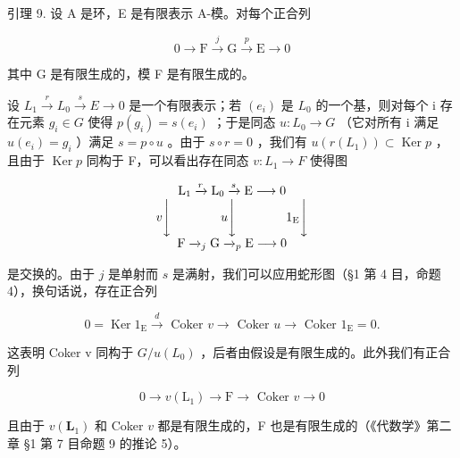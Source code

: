 引理 9. 设 A 是环，E 是有限表示 A-模。对每个正合列

\[
0 \longrightarrow \mathrm{F} \stackrel {j} {\longrightarrow} \mathrm{G} \stackrel {p} {\longrightarrow} \mathrm{E} \longrightarrow 0
\]

其中 G 是有限生成的，模 F 是有限生成的。

设 \(L_{1} \stackrel{r}{\rightarrow} L_{0} \stackrel{s}{\rightarrow} E \rightarrow 0\) 是一个有限表示；若 \((e_{i})\) 是 \(L_{0}\) 的一个基，则对每个 i 存在元素 \(g_{i} \in G\) 使得 \(p(g_{i}) = s(e_{i})\) ；于是同态 \(u: L_{0} \rightarrow G\) （它对所有 i 满足 \(u(e_{i}) = g_{i}\) ）满足 \(s = p \circ u\) 。由于 \(s \circ r = 0\) ，我们有 \(u(r(L_{1})) \subset \operatorname{Ker} p\) ，且由于 \(\operatorname{Ker} p\) 同构于 F，可以看出存在同态 \(v: L_{1} \rightarrow F\) 使得图

\[
\begin{array}{c} \mathrm{L} _ {1} \xrightarrow {r} \mathrm{L} _ {0} \xrightarrow {s} \mathrm{E} \longrightarrow 0 \\ v \Biggl \downarrow \qquad \qquad u \Biggl \downarrow \qquad \qquad 1 _ {\mathrm{E}} \Biggl \downarrow \\ \mathrm{F} \xrightarrow {} _ {j} \mathrm{G} \xrightarrow {} _ {p} \mathrm{E} \longrightarrow 0 \end{array}
\]

是交换的。由于 \(j\) 是单射而 \(s\) 是满射，我们可以应用蛇形图（§1 第 4 目，命题 4），换句话说，存在正合列

\[
0 = \operatorname{Ker} 1 _ {\mathrm{E}} \xrightarrow {d} \text { Coker } v \longrightarrow \text { Coker } u \longrightarrow \text { Coker } 1 _ {\mathrm{E}} = 0.
\]

这表明 Coker v 同构于 \(G/u(L_{0})\) ，后者由假设是有限生成的。此外我们有正合列

\[
0 \rightarrow v (\mathrm{L} _ {1}) \rightarrow \mathrm{F} \rightarrow \text { Coker } v \rightarrow 0
\]

且由于 \(v(\mathbf{L}_1)\) 和 Coker \(v\) 都是有限生成的，F 也是有限生成的（《代数学》第二章 §1 第 7 目命题 9 的推论 5）。

